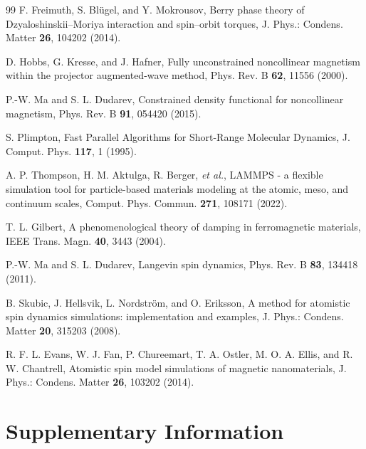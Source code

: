 \documentclass[aps,prb,preprint,superscriptaddress,longbibliography,nofootinbib]{revtex4-2}
\renewcommand{\figurename}{Fig.}
\renewcommand{\tablename}{Table}
\begin{document}
\begin{thebibliography}{99}
 F. Freimuth, S. Bl\"ugel, and Y. Mokrousov, Berry phase theory of Dzyaloshinskii--Moriya interaction and spin--orbit torques, J. Phys.: Condens. Matter \textbf{26}, 104202 (2014).

 D. Hobbs, G. Kresse, and J. Hafner, Fully unconstrained noncollinear magnetism within the projector augmented-wave method, Phys. Rev. B \textbf{62}, 11556 (2000).

 P.-W. Ma and S. L. Dudarev, Constrained density functional for noncollinear magnetism, Phys. Rev. B \textbf{91}, 054420 (2015).

 S. Plimpton, Fast Parallel Algorithms for Short-Range Molecular Dynamics, J. Comput. Phys. \textbf{117}, 1 (1995).

 A. P. Thompson, H. M. Aktulga, R. Berger, \emph{et al.}, LAMMPS - a flexible simulation tool for particle-based materials modeling at the atomic, meso, and continuum scales, Comput. Phys. Commun. \textbf{271}, 108171 (2022).

 T. L. Gilbert, A phenomenological theory of damping in ferromagnetic materials, IEEE Trans. Magn. \textbf{40}, 3443 (2004).

 P.-W. Ma and S. L. Dudarev, Langevin spin dynamics, Phys. Rev. B \textbf{83}, 134418 (2011).

 B. Skubic, J. Hellsvik, L. Nordstr\"om, and O. Eriksson, A method for atomistic spin dynamics simulations: implementation and examples, J. Phys.: Condens. Matter \textbf{20}, 315203 (2008).

 R. F. L. Evans, W. J. Fan, P. Chureemart, T. A. Ostler, M. O. A. Ellis, and R. W. Chantrell, Atomistic spin model simulations of magnetic nanomaterials, J. Phys.: Condens. Matter \textbf{26}, 103202 (2014).

\end{thebibliography}

\clearpage
\nolinenumbers
\setcounter{figure}{0}
\setcounter{table}{0}
\renewcommand{\figurename}{Supplementary Fig.}
\renewcommand{\tablename}{Supplementary Table}
\renewcommand{\theHfigure}{S\arabic{figure}}
\renewcommand{\theHtable}{S\arabic{table}}

\section*{Supplementary Information}
\end{document}
